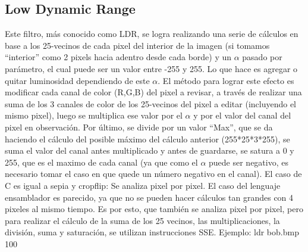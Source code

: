 \documentclass[a4paper]{article}
\begin{document}
\subsection{Low Dynamic Range}
Este filtro, más conocido como LDR, se logra realizando una serie de cálculos en base a los 25-vecinos de cada pixel del interior
de la imagen (si tomamos ``interior'' como 2 pixels hacia adentro desde cada borde) y un $\alpha$ pasado por parámetro, el cual puede ser
un valor entre -255 y 255. Lo que hace es agregar o quitar luminosidad dependiendo de este $\alpha$. El método para lograr este efecto es
modificar cada canal de color (R,G,B) del pixel a revisar, a través de realizar una suma de los 3 canales de color de los 25-vecinos del pixel a editar (incluyendo el mismo pixel),
luego se multiplica ese valor por el $\alpha$ y por el valor del canal del pixel en observación. Por último, se divide por un valor ``Max'',
que se da haciendo el cálculo del posible máximo del cálculo anterior (255*25*3*255), se suma el valor del canal antes multiplicado y antes
de guardarse, se satura a 0 y 255, que es el maximo de cada canal (ya que como el $\alpha$ puede ser negativo, es necesario tomar el caso
en que quede un número negativo en el canal).
\newline
El caso de C es igual a sepia y cropflip: Se analiza pixel por pixel. El caso del lenguaje ensamblador es parecido, ya que no se pueden
hacer cálculos tan grandes con 4 pixeles al mismo tiempo. Es por esto, que también se analiza pixel por pixel, pero para realizar el
cálculo de la suma de los 25 vecinos, las multiplicaciones, la división, suma y saturación, se utilizan instrucciones SSE.
\newline
Ejemplo: ldr bob.bmp 100
\end{document}
